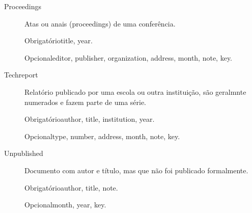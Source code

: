\documentclass[article,openany]{memoir}
\newcommand{\obrigatorios}{%
   \par Obrigatório\dotfill\ignorespaces}
\newcommand{\opcionais}{
   \par Opcional\dotfill\ignorespaces}
\begin{document}
\begin{description}
\item[Proceedings]
Atas ou anais (proceedings) de uma conferência.

  \obrigatorios title, year.

  \opcionais editor, publisher, organization, address, month, note, key.


\item[Techreport]
Relatório publicado por uma escola ou outra instituição, são geralmnte
numerados e fazem parte de uma série.

  \obrigatorios author, title, institution, year.

  \opcionais type, number, address, month, note, key.


\item[Unpublished]
Documento com autor e título, mas que não foi publicado formalmente.

  \obrigatorios author, title, note.

  \opcionais month, year, key.


\end{description}
\end{document}
